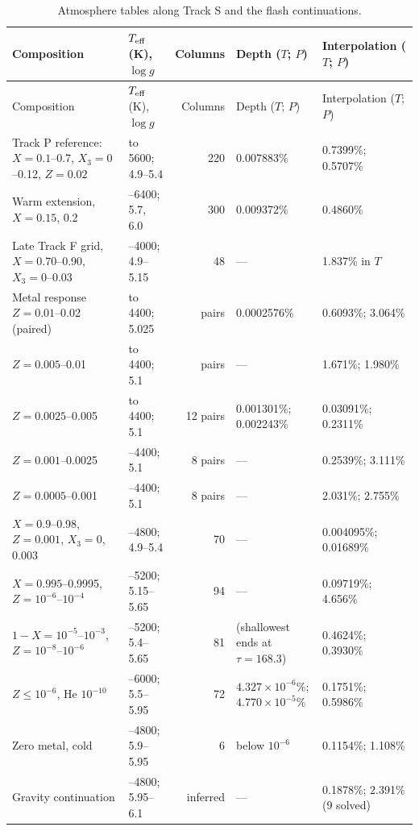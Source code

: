 {\small\renewcommand{\arraystretch}{1.1}
\begin{longtable}{@{}>{\raggedright\arraybackslash}p{}>{\raggedright\arraybackslash}p{}rp{}p{}@{}}
\caption{Atmosphere tables along Track S and the flash continuations.}\label{tab:atm}\\
\toprule Composition & $T_{\rm eff}$ (K), $\log g$ & Columns & Depth ($T$; $P$) & Interpolation ($T$; $P$) \\\midrule\endfirsthead
\toprule Composition & $T_{\rm eff}$ (K), $\log g$ & Columns & Depth ($T$; $P$) & Interpolation ($T$; $P$) \\\midrule\endhead
Track P reference: $X=0.1$--0.7, $X_3=0$--0.12, $Z=0.02$ & to 5600; 4.9--5.4 & 220 & 0.007883\% & 0.7399\%; 0.5707\% \\
Warm extension, $X=0.15$, 0.2 & 5400--6400; 5.7, 6.0 & 300 & 0.009372\% & 0.4860\% \\
Late Track F grid, $X=0.70$--0.90, $X_3=0$--0.03 & 3400--4000; 4.9--5.15 & 48 & --- & 1.837\% in $T$ \\
Metal response $Z=0.01$--0.02 (paired) & to 4400; 5.025 & pairs & 0.0002576\% & 0.6093\%; 3.064\% \\
$Z=0.005$--0.01 & to 4400; 5.1 & pairs & --- & 1.671\%; 1.980\% \\
$Z=0.0025$--0.005 & to 4400; 5.1 & 12 pairs & 0.001301\%; 0.002243\% & 0.03091\%; 0.2311\% \\
$Z=0.001$--0.0025 & 4000--4400; 5.1 & 8 pairs & --- & 0.2539\%; 3.111\% \\
$Z=0.0005$--0.001 & 4000--4400; 5.1 & 8 pairs & --- & 2.031\%; 2.755\% \\
$X=0.9$--0.98, $Z=0.001$, $X_3=0$, 0.003 & 4000--4800; 4.9--5.4 & 70 & --- & 0.004095\%; 0.01689\% \\
$X=0.995$--0.9995, $Z=10^{-6}$--$10^{-4}$ & 4600--5200; 5.15--5.65 & 94 & --- & 0.09719\%; 4.656\% \\
$1-X=10^{-5}$--$10^{-3}$, $Z=10^{-8}$--$10^{-6}$ & 4600--5200; 5.4--5.65 & 81 & (shallowest ends at $\tau=168.3$) & 0.4624\%; 0.3930\% \\
$Z\leq10^{-6}$, He $10^{-10}$ & 4700--6000; 5.5--5.95 & 72 & $4.327\times10^{-6}$\%; $4.770\times10^{-5}$\% & 0.1751\%; 0.5986\% \\
Zero metal, cold & 4650--4800; 5.9--5.95 & 6 & below $10^{-6}$ & 0.1154\%; 1.108\% \\
Gravity continuation & 4650--4800; 5.95--6.1 & inferred & --- & 0.1878\%; 2.391\% (9 solved) \\

\end{longtable}}
